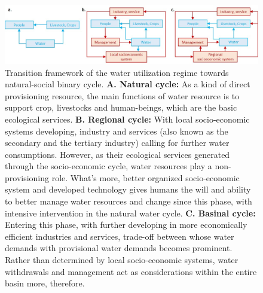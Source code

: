 \documentclass[9pt, twocolumn, twoside, lineno]{pnas-new}
\begin{document}
\begin{figure}[thbp]
	\centering
	\includegraphics[width=\linewidth]{../../figures/main/transition.jpg}
	\caption{
		Transition framework of the water utilization regime towards natural-social binary cycle.
		\textbf{A. Natural cycle:} As a kind of direct provisioning resource, the main functions of water resource is to support crop, livestocks and human-beings, which are the basic ecological services.
		\textbf{B. Regional cycle:} With local socio-economic systems developing, industry and services (also known as the secondary and the tertiary industry) calling for further water consumptions.
		However, as their ecological services generated through the socio-economic cycle, water resources play a non-provisioning role. What's more, better organized socio-economic system and developed technology gives humans the will and ability to better manage water resources and change since this phase, with intensive intervention in the natural water cycle. 
		\textbf{C. Basinal cycle:} Entering this phase, with further developing in more economically efficient industries and services, trade-off between whose water demands with provisional water demands becomes prominent. Rather than determined by local socio-economic systems, water withdrawals and management act as considerations within the entire basin more, therefore. 
	}
	\label{fig:framework}
\end{figure}
\end{document}
